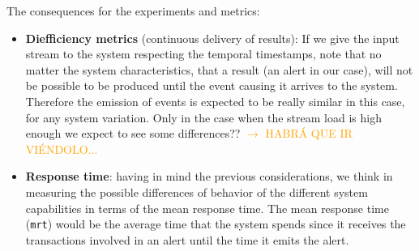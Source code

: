 The consequences for the experiments and metrics:

\begin{itemize}
  \item \textbf{Diefficiency metrics} (continuous delivery of results): If we give the input stream to the system respecting the temporal timestamps, note that no matter the system characteristics, that a result (an alert in our case), will not be possible to be produced until the event causing it arrives to the system. Therefore the emission of events is expected to be really similar in this case, for any system variation. Only in the case when the stream load is high enough we expect to see some differences?? \textcolor{orange}{$\rightarrow$ HABRÁ QUE IR VIÉNDOLO...}
  \item \textbf{Response time}: having in mind the previous considerations, we think in measuring the possible differences of behavior of the different system capabilities in terms of the mean response time. The mean response time (\texttt{mrt}) would be the average time that the system spends since it receives the transactions involved in an alert until the time it emits the alert.
\end{itemize}

